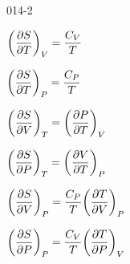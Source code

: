 \begin{mitframe}{014-2}

    
\begin{listone}
        
    \item $\bigg(\dfrac{\partial\entropy}{\partial\Temp}\bigg)_{\vol}=\dfrac{\cv}{\Temp}$
        
    \item$\bigg(\dfrac{\partial\entropy}{\partial\Temp}\bigg)_{\p} = \dfrac{\cp}{\Temp}$
    
    \item $\bigg(\dfrac{\partial\entropy}{\partial\vol}\bigg)_{\Temp} =\bigg(\dfrac{\partial\p}{\partial\Temp}\bigg)_{\vol}$
    
    
    
    \item$\bigg(\dfrac{\partial\entropy}{\partial\p}\bigg)_{\Temp} = \bigg(\dfrac{\partial\vol}{\partial\Temp}\bigg)_{\p}$
        
    \item $\bigg(\dfrac{\partial\entropy}{\partial\vol}\bigg)_{\p} =\dfrac{\cp}{\Temp}\bigg(\dfrac{\partial\Temp}{\partial\vol}\bigg)_{\p}$
    
    \item$\bigg(\dfrac{\partial\entropy}{\partial\p}\bigg)_{\p} = \dfrac{\cv}{\Temp}\bigg(\dfrac{\partial\Temp}{\partial\p}\bigg)_{\vol}$
    
 
\end{listone}			

\end{mitframe}